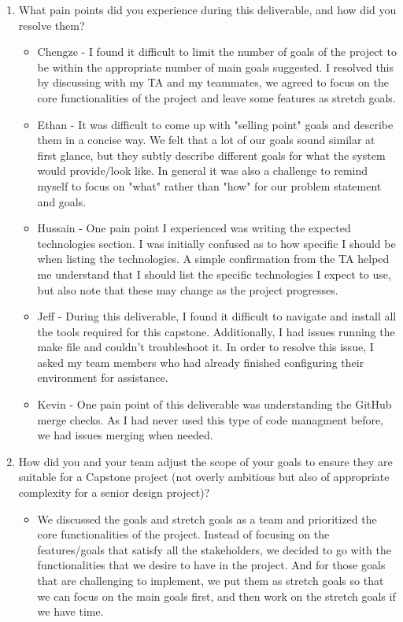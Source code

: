 \documentclass{article}
\begin{document}
\begin{enumerate}
    \item What pain points did you experience during this deliverable, and how
    did you resolve them?
    \begin{itemize}
        \item Chengze - I found it difficult to limit the number 
        of goals of the project to be within the appropriate number 
        of main goals suggested. I resolved this by discussing with 
        my TA and my teammates, we agreed to focus on the core 
        functionalities of the project and leave some features as 
        stretch goals. 
        \item Ethan - It was difficult to come up with "selling point" goals
          and describe them in a concise way. We felt that a lot of our goals
          sound similar at first glance, but they subtly describe different
          goals for what the system would provide/look like. In general it was
          also a challenge to remind myself to focus on "what" rather than
          "how" for our problem statement and goals.
        \item Hussain - One pain point I experienced was writing the 
        expected technologies section. I was initially confused as to how 
        specific I should be when listing the technologies. A simple
        confirmation from the TA helped me understand that I should
        list the specific technologies I expect to use, but also note that
        these may change as the project progresses.
        \item Jeff - During this deliverable, I found it difficult to 
        navigate and install all the tools required for this capstone. 
        Additionally, I had issues running the make file and 
        couldn't troubleshoot it. In order to resolve this issue,
        I asked my team members who had already finished configuring their
        environment for assistance.
        \item Kevin - One pain point of this deliverable was understanding the 
        GitHub merge checks. As I had never used this type of code managment 
        before, we had issues merging when needed. 
    \end{itemize}
    
    \item How did you and your team adjust the scope of your goals to ensure
    they are suitable for a Capstone project (not overly ambitious but also of
    appropriate complexity for a senior design project)?
    \begin{itemize}
        \item We discussed the goals and stretch goals as a team
        and prioritized the core functionalities of the project.
        Instead of focusing on the features/goals that satisfy all 
        the stakeholders, we decided to go with the functionalities that
        we desire to have in the project. And for those goals that are 
        challenging to implement, we put them as stretch goals so that 
        we can focus on the main goals first, and then work on the 
        stretch goals if we have time.
    \end{itemize}
\end{enumerate}  
\end{document}
